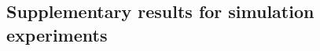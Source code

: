 \documentclass[12pt]{article}
\begin{document}















\subsection{Supplementary results for simulation experiments}


\end{document}
